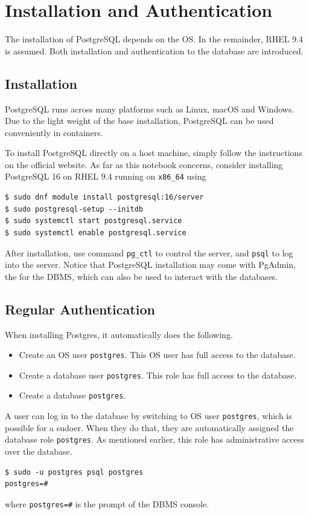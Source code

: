 \section{Installation and Authentication}

The installation of PostgreSQL depends on the OS. In the remainder, RHEL 9.4 is assumed. Both installation and authentication to the database are introduced.

\subsection{Installation}

PostgreSQL runs across many platforms such as Linux, macOS and Windows. Due to the light weight of the base installation, PostgreSQL can be used conveniently in containers.

To install PostgreSQL directly on a host machine, simply follow the instructions on the official website. As far as this notebook concerns, consider installing PostgreSQL 16 on RHEL 9.4 running on \verb|x86_64| using
\begin{lstlisting}
$ sudo dnf module install postgresql:16/server
$ sudo postgresql-setup --initdb
$ sudo systemctl start postgresql.service
$ sudo systemctl enable postgresql.service
\end{lstlisting}

After installation, use command \verb|pg_ctl| to control the server, and \verb|psql| to log into the server. Notice that PostgreSQL installation may come with PgAdmin, the  for the DBMS, which can also be used to interact with the databases.

\subsection{Regular Authentication}

When installing Postgres, it automatically does the following.
\begin{itemize}
  \item Create an OS user \texttt{postgres}. This OS user has full access to the database.
  \item Create a database user \texttt{postgres}. This role has full access to the database.
  \item Create a database \texttt{postgres}.
\end{itemize}

A user can log in to the database by switching to OS user \verb|postgres|, which is possible for a sudoer. When they do that, they are automatically assigned the database role \verb|postgres|. As mentioned earlier, this role has administrative access over the database.
\begin{lstlisting}
$ sudo -u postgres psql postgres
postgres=#
\end{lstlisting}
where \verb|postgres=#| is the prompt of the DBMS console.

